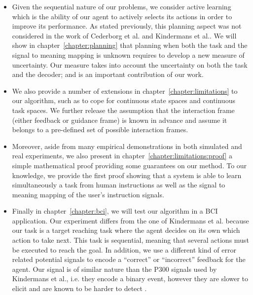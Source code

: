 \begin{itemize}
\item Given the sequential nature of our problems, we consider active learning which is the ability of our agent to actively selects its actions in order to improve its performance. As stated previously, this planning aspect was not considered in the work of Cederborg et al. and Kindermans et al.. We will show in chapter~\ref{chapter:planning} that planning when both the task and the signal to meaning mapping is unknown requires to develop a new measure of uncertainty. Our measure takes into account the uncertainty on both the task and the decoder; and is an important contribution of our work.

\item We also provide a number of extensions in chapter~\ref{chapter:limitations} to our algorithm, such as to cope for continuous state spaces and continuous task spaces. We further release the assumption that the interaction frame (either feedback or guidance frame) is known in advance and assume it belongs to a pre-defined set of possible interaction frames.

\item Moreover, aside from many empirical demonstrations in both simulated and real experiments, we also present in chapter~\ref{chapter:limitations:proof} a simple mathematical proof providing some guarantees on our method. To our knowledge, we provide the first proof showing that a system is able to learn simultaneously a task from human instructions as well as the signal to meaning mapping of the user's instruction signals.

\item Finally in chapter~\ref{chapter:bci}, we will test our algorithm in a BCI application. Our experiment differs from the one of Kindermans et al. \cite{Kindermans2012a,kindermans2014true} because our task is a target reaching task where the agent decides on its own which action to take next. This task is sequential, meaning that several actions must be executed to reach the goal. In addition, we use a different kind of error related potential signals to encode a ``correct'' or ``incorrect'' feedback for the agent. Our signal is of similar nature than the P300 signals used by Kindermans et al., i.e. they encode a binary event, however they are slower to elicit and are known to be harder to detect .

\end{itemize}

